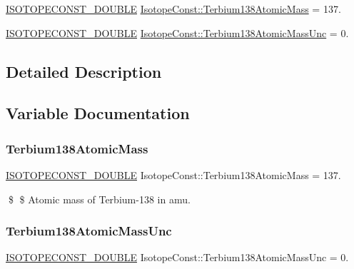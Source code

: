 \begin{DoxyCompactItemize}
\item 
\mbox{\hyperlink{group___isotope_const-_macros_ga8f45a7272ce02c0b4c65c44636ed719a}{I\+S\+O\+T\+O\+P\+E\+C\+O\+N\+S\+T\+\_\+\+D\+O\+U\+B\+LE}} \mbox{\hyperlink{group___isotope_const-_terbium-_tb138_gababe1294a8557f9afa85309bda249960}{Isotope\+Const\+::\+Terbium138\+Atomic\+Mass}} = 137.
\item 
\mbox{\hyperlink{group___isotope_const-_macros_ga8f45a7272ce02c0b4c65c44636ed719a}{I\+S\+O\+T\+O\+P\+E\+C\+O\+N\+S\+T\+\_\+\+D\+O\+U\+B\+LE}} \mbox{\hyperlink{group___isotope_const-_terbium-_tb138_gac62f8948a37dda30a93ad4d47bf7c0f0}{Isotope\+Const\+::\+Terbium138\+Atomic\+Mass\+Unc}} = 0.
\end{DoxyCompactItemize}


\subsection{Detailed Description}


\subsection{Variable Documentation}
\mbox{\label{group___isotope_const-_terbium-_tb138_gababe1294a8557f9afa85309bda249960}} 
\subsubsection{\texorpdfstring{Terbium138\+Atomic\+Mass}{Terbium138AtomicMass}}
{\footnotesize\ttfamily \mbox{\hyperlink{group___isotope_const-_macros_ga8f45a7272ce02c0b4c65c44636ed719a}{I\+S\+O\+T\+O\+P\+E\+C\+O\+N\+S\+T\+\_\+\+D\+O\+U\+B\+LE}} Isotope\+Const\+::\+Terbium138\+Atomic\+Mass = 137.}

\$ \$ Atomic mass of Terbium-\/138 in amu. \mbox{\label{group___isotope_const-_terbium-_tb138_gac62f8948a37dda30a93ad4d47bf7c0f0}} 
\subsubsection{\texorpdfstring{Terbium138\+Atomic\+Mass\+Unc}{Terbium138AtomicMassUnc}}
{\footnotesize\ttfamily \mbox{\hyperlink{group___isotope_const-_macros_ga8f45a7272ce02c0b4c65c44636ed719a}{I\+S\+O\+T\+O\+P\+E\+C\+O\+N\+S\+T\+\_\+\+D\+O\+U\+B\+LE}} Isotope\+Const\+::\+Terbium138\+Atomic\+Mass\+Unc = 0.}

